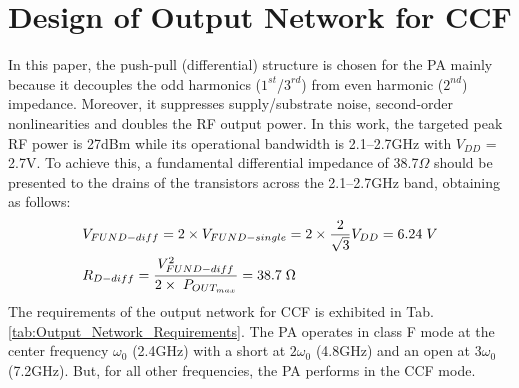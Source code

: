 \documentclass[conference]{IEEEtran}
\begin{document}
 

\section{Design of Output Network for CCF}
\label{section:ON}
In this paper, the push-pull (differential) structure is chosen for the PA mainly because it decouples the odd harmonics ($1^{st}$/$3^{rd}$) from even harmonic ($2^{nd}$) impedance. Moreover, it suppresses supply/substrate noise, second-order nonlinearities and doubles the RF output power. 
In this work, the targeted peak RF power is 27dBm  while its operational bandwidth is 2.1--2.7GHz with $V_{DD}$ = 2.7V. To achieve this, a  fundamental differential impedance of 38.7$\Omega$ should be presented to the drains of the transistors across the 2.1--2.7GHz band, obtaining as follows:
\vspace{-0.05in}
\begin{equation}
\begin{aligned}
&V_{FUND-diff}=2\times V_{FUND-single}=2\times\frac{2}{\sqrt{3}} V_{DD}=6.24 \hspace{1mm}V\\
&R_{D-diff}=\frac{V_{FUND-diff}^{2}}{2\times\hspace{1mm} P_{OUT_{max}}}=38.7 \hspace{1mm} \Omega
\label{eqn_diff_imp}
\end{aligned}
\end{equation}
The requirements of the output network for CCF is exhibited in Tab. \ref{tab:Output_Network_Requirements}. The PA operates in class F mode at the center frequency $\omega_0$ (2.4GHz) with a short at $2\omega_0$ (4.8GHz) and an open at $3\omega_0$ (7.2GHz). But, for all other frequencies, the PA performs in the CCF mode. 
\end{document}
